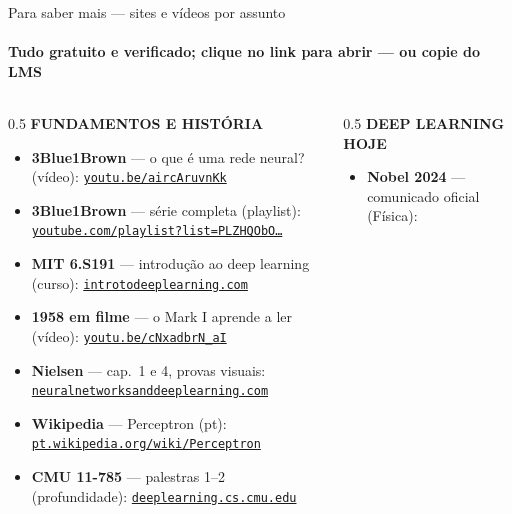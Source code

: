 \documentclass[aspectratio=169, 11pt]{beamer}
\begin{document}
\begin{frame}{Para saber mais — sites e vídeos por assunto}
  \framesubtitle{Tudo gratuito e verificado; clique no link para abrir — ou copie do LMS}

  \begin{columns}[T]
    \begin{column}{0.5\textwidth}
      {\color{icCinza}\bfseries\scriptsize FUNDAMENTOS E HISTÓRIA}
      {\scriptsize
      \begin{itemize}\setlength{\itemsep}{0.3ex}
        \item \textbf{3Blue1Brown} — o que é uma rede neural? (vídeo):
              \href{https://youtu.be/aircAruvnKk}{\color{icAzulClaro}\texttt{youtu.be/aircAruvnKk}}
        \item \textbf{3Blue1Brown} — série completa (playlist):
              \href{https://www.youtube.com/playlist?list=PLZHQObOWTQDNU6R1_67000Dx_ZCJB-3pi}{\color{icAzulClaro}\texttt{youtube.com/playlist?list=PLZHQObO\ldots}}
        \item \textbf{MIT 6.S191} — introdução ao deep learning (curso):
              \href{https://introtodeeplearning.com}{\color{icAzulClaro}\texttt{introtodeeplearning.com}}
        \item \textbf{1958 em filme} — o Mark I aprende a ler (vídeo):
              \href{https://youtu.be/cNxadbrN_aI}{\color{icAzulClaro}\texttt{youtu.be/cNxadbrN\_aI}}
        \item \textbf{Nielsen} — cap.\ 1 e 4, provas visuais:
              \href{https://neuralnetworksanddeeplearning.com}{\color{icAzulClaro}\texttt{neuralnetworksanddeeplearning.com}}
        \item \textbf{Wikipedia} — Perceptron (pt):
              \href{https://pt.wikipedia.org/wiki/Perceptron}{\color{icAzulClaro}\texttt{pt.wikipedia.org/wiki/Perceptron}}
        \item \textbf{CMU 11-785} — palestras 1--2 (profundidade):
              \href{https://deeplearning.cs.cmu.edu}{\color{icAzulClaro}\texttt{deeplearning.cs.cmu.edu}}
      \end{itemize}}
    \end{column}
    \begin{column}{0.5\textwidth}
      {\color{icCinza}\bfseries\scriptsize DEEP LEARNING HOJE}
      {\scriptsize
      \begin{itemize}\setlength{\itemsep}{0.3ex}
        \item \textbf{Nobel 2024} — comunicado oficial (Física):

\end{itemize}}
\end{column}
\end{columns}
\end{frame}
\end{document}
